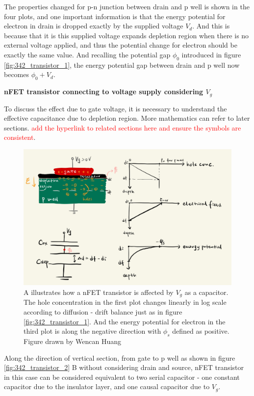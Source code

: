 The properties changed for p-n junction between drain and p well is shown in the four plots, and one important information is that the energy potential for electron in drain is dropped exactly by the supplied voltage \(V_d\). And this is because that it is this supplied voltage expands depletion region when there is no external voltage applied, and thus the potential change for electron should be exactly the same value. And recalling the potential gap \(\phi_{0}\) introduced in figure \ref{fig:342_transistor_1}, the energy potential gap between drain and p well now becomes \(\phi_{0}+V_{d}\). 

\bigskip
\noindent\textbf{nFET transistor connecting to voltage supply considering \(V_{g}\)}

To discuss the effect due to gate voltage, it is necessary to understand the effective capacitance due to depletion region. More mathematics can refer to later sections. \textcolor{red}{add the hyperlink to related sections here and ensure the symbols are consistent}.

\begin{figure}[H]
    \centering
    \includegraphics[width=0.9\linewidth]{Figures/PNjunc4Transistor_3.jpeg}
    \caption{A illustrates how a nFET transistor is affected by \(V_{g}\) as a capacitor. The hole concentration in the first plot changes linearly in log scale according to diffusion - drift balance just as in figure \ref{fig:342_transistor_1}. And the energy potential for electron in the third plot is along the negative direction with \(\phi_s\) defined as positive. Figure drawn by Wencan Huang}
    \label{fig:342_transistor_3}
\end{figure}

Along the direction of vertical section, from gate to p well as shown in figure \ref{fig:342_transistor_2} B without considering drain and source, nFET transistor in this case can be considered equivalent to two serial capacitor - one constant capacitor due to the insulator layer, and one causal capacitor due to \(V_{g}\). 

